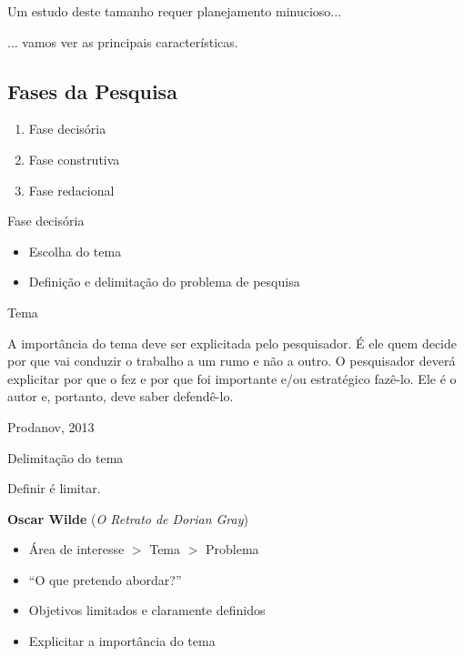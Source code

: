 \documentclass{beamer}
\begin{document}
\begin{frame}{}
  \begin{block}{}
    \centering
    \footnotesize
    Um estudo deste tamanho requer planejamento minucioso...

    \bigskip
    \normalsize
    ... vamos ver as principais características.
  \end{block}
\end{frame}

\subsection{Fases da Pesquisa}

\begin{frame}
  \begin{enumerate}
  \item \alert<2>{Fase decisória}
    \bigskip
  \item Fase construtiva
    \bigskip
  \item Fase redacional
  \end{enumerate}
\end{frame}

\begin{frame}{Fase decisória}
  \begin{itemize}
  \item Escolha do tema
    \bigskip
  \item Definição e delimitação do problema de pesquisa
  \end{itemize}
\end{frame}

\begin{frame}{Tema}
  \begin{block}{}
    \footnotesize
    A importância do tema deve ser explicitada pelo pesquisador. É ele
    quem decide por que vai conduzir o trabalho a um rumo e não a
    outro. O pesquisador deverá explicitar por que o fez e por que foi
    importante e/ou estratégico fazê-lo. Ele é o autor e, portanto,
    deve saber defendê-lo.
  \end{block}

  \vfill
  \scriptsize
  \hfill Prodanov, 2013
\end{frame}

\begin{frame}{Delimitação do tema}
  \begin{block}{}
    Definir é limitar.

    \bigskip
    \scriptsize
    \hfill {\bf Oscar Wilde} ({\em O Retrato de Dorian Gray})
  \end{block}
  \bigskip
  \begin{itemize}
    \footnotesize
  \item Área de interesse $>$ Tema $>$ Problema
  \item ``O que pretendo abordar?''
  \item Objetivos limitados e claramente definidos
  \item Explicitar a importância do tema
  \end{itemize}
\end{frame}
\end{document}
